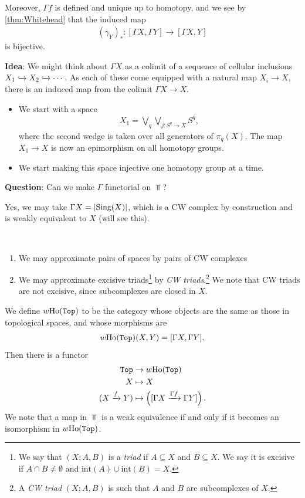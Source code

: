 \documentclass{article}[11pt]
\begin{document}
Moreover, $\Gamma f$ is defined and unique up to homotopy, and we see by  \autoref{thm:Whitehead} that the induced map
\begin{align*}
	(\gamma_Y)_\ast \colon [\Gamma X, \Gamma Y] \to [\Gamma X, Y]
\end{align*}
is bijective.


\textbf{Idea}: We might think about $\Gamma X$ as a colimit of a sequence of cellular inclusions $X_1\xhookrightarrow{} X_2\xhookrightarrow{} \cdots$. As each of these come equipped with a natural map $X_i \to X$, there is an induced map from the colimit $\Gamma X \to X$.
\begin{itemize}
	\item We start with a space
	\begin{align*}
		X_1 = \bigvee_q \bigvee_{j \colon S^q \to X} S^q,
	\end{align*}
	where the second wedge is taken over all generators of $\pi_q(X)$. The map $X_1 \to X$ is now an epimorphism on all homotopy groups.
	\item We start making this space injective one homotopy group at a time.
\end{itemize}

\textbf{Question}: Can we make $\Gamma$ functorial on $\Top$?

Yes, we may take $\Gamma X = |\text{Sing}(X)|$, which is a CW complex by construction and is weakly equivalent to $X$ (will see this).

\begin{remark}\label{rmk:excisive-triad-approximation} $\ $
\begin{enumerate}
	\item We may approximate pairs of spaces by pairs of CW complexes
	\item We may approximate excisive triads\footnote{We say that $(X;A,B)$ is a \textit{triad} if $A\subseteq X$ and $B\subseteq X$. We say it is excisive if $A\cap B \neq \emptyset$ and $\text{int}(A)\cup \text{int}(B) = X$.} by \textit{CW triads}.\footnote{A \textit{CW triad} $(X;A,B)$ is such that $A$ and $B$ are subcomplexes of $X$.} We note that CW triads are not excisive, since subcomplexes are closed in $X$.
\end{enumerate}
\end{remark}

\begin{definition} We define $w\text{Ho}(\texttt{Top})$ to be the category whose objects are the same as those in topological spaces, and whose morphisms are
\begin{align*}
	w\text{Ho}(\texttt{Top})(X,Y) = [\Gamma X, \Gamma Y].
\end{align*}
Then there is a functor
\begin{align*}
	\texttt{Top} &\to w\text{Ho}(\texttt{Top}) \\
	X &\mapsto X \\
	(X\xrightarrow{f} Y) & \mapsto \left( [\Gamma X \xrightarrow{\Gamma f} \Gamma Y]\right).
\end{align*}
We note that a map in $\Top$ is a weak equivalence if and only if it becomes an isomorphism in $w\text{Ho}(\texttt{Top})$.
\end{definition}
\end{document}
